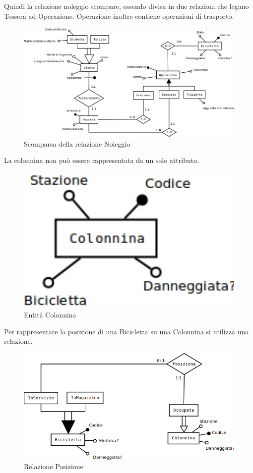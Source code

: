 \documentclass[a4paper,twoside]{article}
\begin{document}
Quindi la relazione noleggio scompare, essendo divisa in due relazioni che legano Tessera ad Operazione. Operazione inoltre contiene operazioni di trasporto.
\begin{figure}[H]
 \centering
  \includegraphics[width=1\textwidth]{Immagini-Grafici/Concettuale07.png}
\caption{Scomparsa della relazione Noleggio}
\end{figure}
La colonnina non può essere rappresentata da un solo attributo.
\begin{figure}[H]
 \centering
  \includegraphics[width=1\textwidth]{Immagini-Grafici/Concettuale08.png}
\caption{Entità Colonnina}
\end{figure}
Per rappresentare la posizione di una Bicicletta su una Colonnina si utilizza una relazione.
\begin{figure}[H]
 \centering
  \includegraphics[width=1\textwidth]{Immagini-Grafici/Concettuale09.png}
\caption{Relazione Posizione}
\end{figure}
\end{document}
